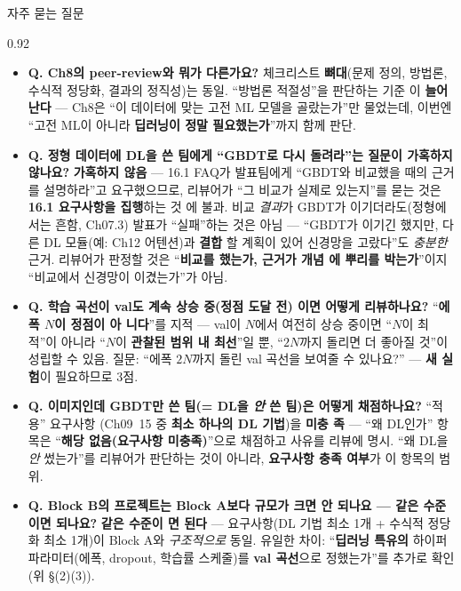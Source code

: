 \begin{frame}{자주 묻는 질문}
\begin{center}\begin{varwidth}{0.92\textwidth}
  \scriptsize
  \begin{itemize}
    \item \textbf{Q. Ch8의 peer-review와 뭐가 다른가요?} \;
      체크리스트 \textbf{뼈대}(문제 정의, 방법론, 수식적 정당화,
      결과의 정직성)는 동일. ``방법론 적절성''을 판단하는 기준
      이 \textbf{늘어난다} — Ch8은 ``이 데이터에 맞는 고전 ML
      모델을 골랐는가''만 물었는데, 이번엔 ``고전 ML이 아니라
      \textbf{딥러닝이 정말 필요했는가}''까지 함께 판단.
    \item \textbf{Q. 정형 데이터에 DL을 쓴 팀에게 ``GBDT로 다시
      돌려라''는 질문이 가혹하지 않나요?} \; \textbf{가혹하지
      않음} — 16.1 FAQ가 발표팀에게 ``GBDT와 비교했을 때의 근거를
      설명하라''고 요구했으므로, 리뷰어가 ``그 비교가 실제로
      있는지''를 묻는 것은 \textbf{16.1 요구사항을 집행}하는 것
      에 불과. 비교 \textit{결과}가 GBDT가 이기더라도(정형에서는
      흔함, Ch07.3) 발표가 ``실패''하는 것은 아님 — ``GBDT가
      이기긴 했지만, 다른 DL 모듈(예: Ch12 어텐션)과 \textbf{결합
      }할 계획이 있어 신경망을 고랐다''도 \textit{충분한} 근거.
      리뷰어가 판정할 것은 ``\textbf{비교를 했는가, 근거가 개념
      에 뿌리를 박는가}''이지 ``비교에서 신경망이 이겼는가''가
      아님.
    \item \textbf{Q. 학습 곡선이 val도 계속 상승 중(정점 도달 전)
      이면 어떻게 리뷰하나요?} \; ``\textbf{에폭 $N$이 정점이 아
      니다}''를 지적 — val이 $N$에서 여전히 상승 중이면 ``$N$이
      최적''이 아니라 ``$N$이 \textbf{관찰된 범위 내 최선}''일
      뿐, ``$2N$까지 돌리면 더 좋아질 것''이 성립할 수 있음. 질문:
      ``에폭 \textbf{$2N$}까지 돌린 val 곡선을 보여줄 수 있나요?''
      — \textbf{새 실험}이 필요하므로 3점.
    \item \textbf{Q. 이미지인데 GBDT만 쓴 팀(= DL을 \textit{안} 쓴
      팀)은 어떻게 채점하나요?}  ``적용'' 요구사항
      (Ch09~15 중 \textbf{최소 하나의 DL 기법})을 \textbf{미충
      족} — ``왜 DL인가'' 항목은 ``\textbf{해당 없음(요구사항
      미충족)}''으로 채점하고 사유를 리뷰에 명시. ``왜 DL을
      \textit{안} 썼는가''를 리뷰어가 판단하는 것이 아니라,
      \textbf{요구사항 충족 여부}가 이 항목의 범위.
    \item \textbf{Q. Block B의 프로젝트는 Block A보다 규모가 크면
      안 되나요 — 같은 수준이면 되나요?} \; \textbf{같은 수준이
      면 된다} — 요구사항(DL 기법 최소 1개 + 수식적 정당화 최소
      1개)이 Block A와 \textit{구조적으로} 동일. 유일한 차이:
      ``\textbf{딥러닝 특유의} 하이퍼파라미터(에폭, dropout,
      학습률 스케줄)를 \textbf{val 곡선}으로 정했는가''를 추가로
      확인(위 §(2)(3)).
  \end{itemize}
\end{varwidth}\end{center}
\end{frame}
